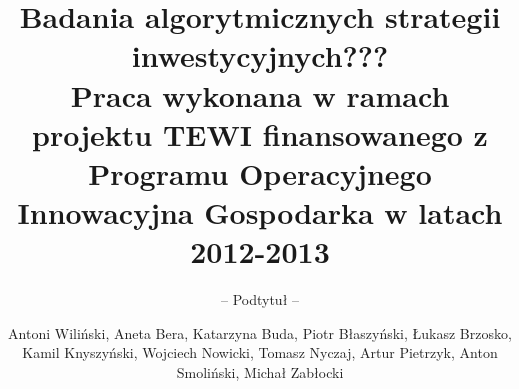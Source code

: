\documentclass[envcountsame,envcountchap]{svmono}
\begin{document}
\author{Antoni Wiliński, Aneta Bera, Katarzyna Buda, Piotr Błaszyński, Łukasz Brzosko, Kamil Knyszyński, Wojciech Nowicki, Tomasz Nyczaj, Artur Pietrzyk, Anton Smoliński, Michał Zabłocki}
\title{Badania algorytmicznych strategii inwestycyjnych???\\
{\small Praca wykonana w ramach projektu TEWI finansowanego z Programu Operacyjnego Innowacyjna Gospodarka w latach 2012-2013}}
\subtitle{-- Podtytuł --}
\maketitle

\frontmatter%




\tableofcontents


\mainmatter%



%

\backmatter%


\printindex

\end{document}
